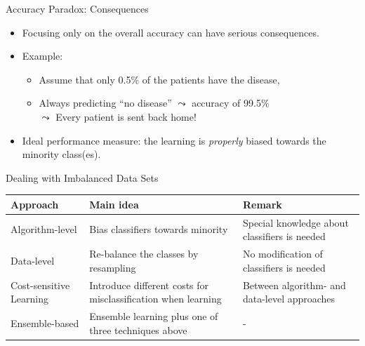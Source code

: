 \documentclass[11pt,compress,t,notes=noshow, xcolor=table]{beamer}
\begin{document}
\begin{vbframe}{Accuracy Paradox: Consequences}
	\begin{itemize}
		\item Focusing only on the overall accuracy can have serious consequences. 
        \vspace{20pt}
        
        \item Example:
		\begin{itemize}
			\small
			\item Assume that only 0.5\% of the patients have the disease,	
			\item Always predicting ``no disease'' $\leadsto$ accuracy of 99.5\% \\	
			$\leadsto$ Every patient is sent back home!		
		\end{itemize}
        \vspace{20pt}
        
		\item Ideal performance measure: the learning is \emph{properly} biased towards the minority class(es).	
	\end{itemize}
\end{vbframe} 


\begin{vbframe}{Dealing with Imbalanced Data Sets}
\small
\begin{table}[h]
    \centering
    \begin{tabular}{p{} p{} p{}}
        \toprule
        \textbf{Approach} & \textbf{Main idea} & \textbf{Remark} \\ [5pt]
        \hline
        Algorithm-level & Bias classifiers towards minority & Special knowledge about classifiers is needed \\ [5pt]
        \hline
        Data-level & Re-balance the classes by resampling & No modification of classifiers is needed \\ [5pt]
        \hline
        Cost-sensitive Learning & Introduce different costs for misclassification when learning & Between algorithm- and data-level approaches\\ [15pt]
        \hline
        Ensemble-based & Ensemble learning plus one of three techniques above & - \\ [5pt]
        \bottomrule
    \end{tabular}
\end{table}

\end{vbframe}



\endlecture
\end{document}
